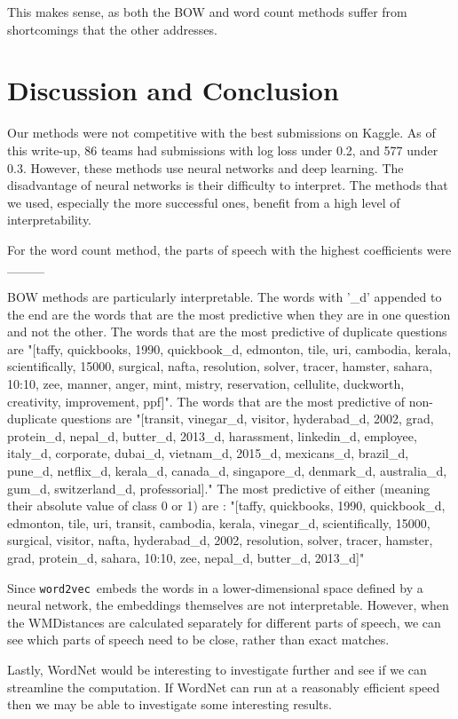 \documentclass{article} %
\newcommand{\wordtvec}{\texttt{word2vec}}
\begin{document}
This makes sense, as both the BOW and word count methods suffer from shortcomings that the other addresses.

\section{Discussion and Conclusion}

Our methods were not competitive with the best submissions on Kaggle. As of this write-up, 86 teams had submissions with log loss under 0.2, and 577 under 0.3. However, these methods use neural networks and deep learning. The disadvantage of neural networks is their difficulty to interpret. The methods that we used, especially the more successful ones, benefit from a high level of interpretability. 

For the word count method, the parts of speech with the highest coefficients were \_\_\_\_

BOW methods are particularly interpretable. The words with '_d' appended to the end are the words that are the most predictive when they are in one question and not the other. The words that are the most predictive of duplicate questions are "[taffy, quickbooks, 1990, quickbook_d, edmonton, tile, uri, cambodia, kerala, scientifically, 15000, surgical, nafta, resolution, solver, tracer, hamster, sahara, 10:10, zee, manner, anger, mint, mistry, reservation, cellulite, duckworth, creativity, improvement, ppf]". The words that are the most predictive of non-duplicate questions are "[transit, vinegar_d, visitor, hyderabad_d, 2002, grad, protein_d, nepal_d, butter_d, 2013_d, harassment, linkedin_d, employee, italy_d, corporate, dubai_d, vietnam_d, 2015_d, mexicans_d, brazil_d, pune_d, netflix_d, kerala_d, canada_d, singapore_d, denmark_d, australia_d, gum_d, switzerland_d, professorial]." The most predictive of either (meaning their absolute value of class 0 or 1) are : "[taffy, quickbooks, 1990, quickbook_d, edmonton, tile, uri, transit, cambodia, kerala, vinegar_d, scientifically, 15000, surgical, visitor, nafta, hyderabad_d, 2002, resolution, solver, tracer, hamster, grad, protein_d, sahara, 10:10, zee, nepal_d, butter_d, 2013_d]"

Since \wordtvec\ embeds the words in a lower-dimensional space defined by a neural network, the embeddings themselves are not interpretable. However, when the WMDistances are calculated separately for different parts of speech, we can see which parts of speech need to be close, rather than exact matches. 

Lastly, WordNet would be interesting to investigate further and see if we can streamline the computation. If WordNet can run at a reasonably efficient speed then we may be able to investigate some interesting results. 
\end{document}
